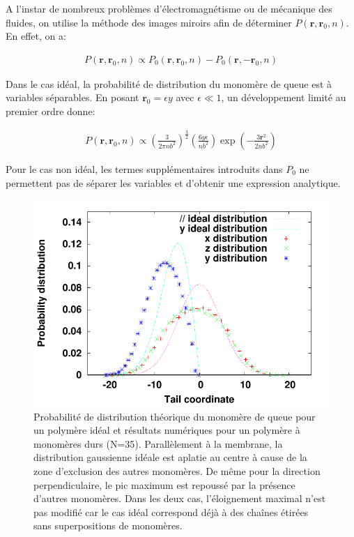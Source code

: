 \documentclass[a4paper,11pt]{article}
\begin{document}
A l'instar de nombreux problèmes d'électromagnétisme ou de mécanique des fluides, on utilise la méthode des images miroirs afin de déterminer $P(\textbf{r},\textbf{r}_0,n)$. En effet, on a:

\begin{eqnarray}
P(\textbf{r},\textbf{r}_0,n) \propto P_0(\textbf{r},\textbf{r}_0,n)-P_0(\textbf{r},-\textbf{r}_0,n)
\end{eqnarray}

Dans le cas idéal, la probabilité de distribution du monomère de queue est à variables séparables. En posant $\textbf{r}_0= \epsilon y$ avec $\epsilon \ll 1$, un développement limité au premier ordre donne:

\begin{eqnarray}
P(\textbf{r},\textbf{r}_0,n) \propto \left(\frac{3}{2\pi n b^2}\right)^\frac{3}{2} \left(\frac{6 y \epsilon}{n b^2}\right)\exp\left(-\frac{3\textbf{r}^2}{2 n b^2}\right)
\end{eqnarray}

Pour le cas non idéal, les termes supplémentaires introduits dans $P_0$ ne permettent pas de séparer les variables et d'obtenir une expression analytique.


\begin{figure}[H]
\begin{minipage}{0.45\linewidth}
\includegraphics[width=1.2\textwidth]{probdistribution.pdf}

\end{minipage}\hfill
\begin{minipage}{0.45\linewidth}
\caption{Probabilité de distribution théorique du monomère de queue pour un polymère idéal et résultats numériques pour un polymère à monomères durs (N=35). Parallèlement à la membrane, la distribution gaussienne idéale est aplatie au centre à cause de la zone d'exclusion des autres monomères. De même pour la direction perpendiculaire, le pic maximum est repoussé par la présence d'autres monomères. Dans les deux cas, l'éloignement maximal n'est pas modifié car le cas idéal correspond déjà à des chaînes étirées sans superpositions de monomères. }
\label{polagainstwall}
\end{minipage}
\end{figure}
\end{document}
